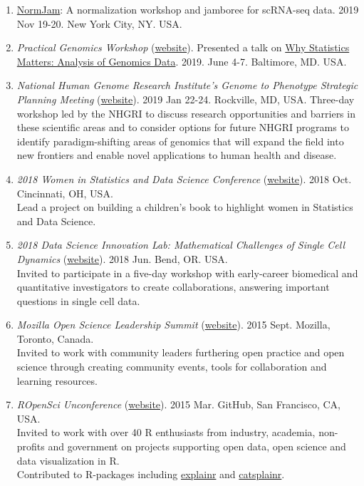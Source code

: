 \documentclass[10pt]{article}
\newcommand{\mycon}[1]{\smallskip\begin{enumerate}[resume,label={\scriptsize \arabic*$\ $},leftmargin=\parindent]\setlength{\itemsep}{#1}\vspace*{-0.7em}}
\newcommand{\ee}{\end{enumerate}}
\begin{document}
\mycon{0.3em}
\item 
\href{https://normjam.github.io}{NormJam}: A normalization workshop and jamboree for scRNA-seq data. 2019 Nov 19-20. New York City, NY. USA.
\item 
{\it Practical Genomics Workshop} (\href{http://genomics.jhu.edu/workshop.html}{website}). Presented a talk on \href{https://speakerdeck.com/stephaniehicks/why-statistics-matters-in-the-analysis-of-genomics-data}{Why Statistics Matters: Analysis of Genomics Data}. 2019. June 4-7. Baltimore, MD. USA.
\item 
{\it National Human Genome Research Institute’s Genome to Phenotype Strategic Planning Meeting} (\href{https://www.genome.gov/27570372/nhgri-strategic-planning-process-establishing-a-2020-vision-for-genomics/}{website}). 2019 Jan 22-24. Rockville, MD, USA. Three-day workshop led by the NHGRI to discuss research opportunities and barriers in these scientific areas and to consider options for future NHGRI programs to identify paradigm-shifting areas of genomics that will expand the field into new frontiers and enable novel applications to human health and disease.
\item 
{\it 2018 Women in Statistics and Data Science Conference} (\href{https://ww2.amstat.org/meetings/wsds/2018/}{website}). 2018 Oct. Cincinnati, OH, USA. \\
Lead a project on building a children's book to highlight women in Statistics and Data Science.
\item 
{\it 2018 Data Science Innovation Lab: Mathematical Challenges of Single Cell Dynamics} (\href{https://bigdatau.ini.usc.edu/innovationlab2018}{website}). 2018 Jun. Bend, OR. USA. \\
Invited to participate in a five-day workshop with early-career biomedical and quantitative investigators to create collaborations, answering important questions in single cell data.
\item 
{\it Mozilla Open Science Leadership Summit} (\href{https://www.mozillascience.org/open-science-summit-2015}{website}). 2015 Sept. Mozilla, Toronto, Canada. \\
Invited to work with community leaders furthering open practice and open science through creating community events, tools for collaboration and learning resources.
\item 
{\it ROpenSci Unconference} (\href{http://unconf.ropensci.org}{website}). 2015 Mar. GitHub, San Francisco, CA, USA. \\ 
Invited to work with over 40 R enthusiasts from industry, academia, non-profits and government on projects supporting open data, open science and data visualization in R.  \\
Contributed to R-packages including \href{https://github.com/hilaryparker/explainr}{explainr} and \href{https://github.com/hilaryparker/catsplainr}{catsplainr}. 

\ee
\end{document}
